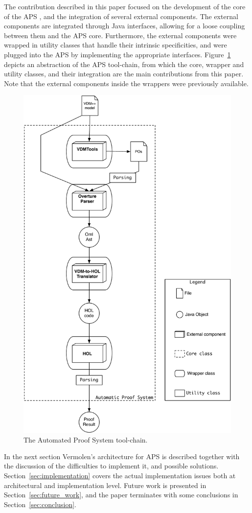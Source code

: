 \documentclass[]{article}
\begin{document}
The contribution described in this paper focused on the development of the core of the APS , and the integration of several external components.
The external components are integrated through Java interfaces, allowing for a loose coupling between them and the APS core.
Furthermore, the external components were wrapped in utility classes that handle their intrinsic specificities, and were plugged into the APS by implementing the appropriate interfaces.
Figure~\ref{fig:aps_contrib} depicts an abstraction of the APS tool-chain, from which the core, wrapper and utility classes, and their integration are the main contributions from this paper.
Note that the external components inside the wrappers were previously available.

\begin{figure}
  \begin{center}
    \includegraphics[width=.6\textwidth]{images/tool_chain.pdf}
    \caption[APS tool-chain]{The Automated Proof System tool-chain.}
    \label{fig:aps_contrib}
  \end{center}
\end{figure}


In the next section Vermolen's architecture for APS is described together with the discussion of the difficulties to implement it, and possible solutions.
Section~\ref{sec:implementation} covers the actual implementation issues both at architectural and implementation level.
Future work is presented in Section~\ref{sec:future_work}, and the paper terminates with some conclusions in Section~\ref{sec:conclusion}.
\end{document}
